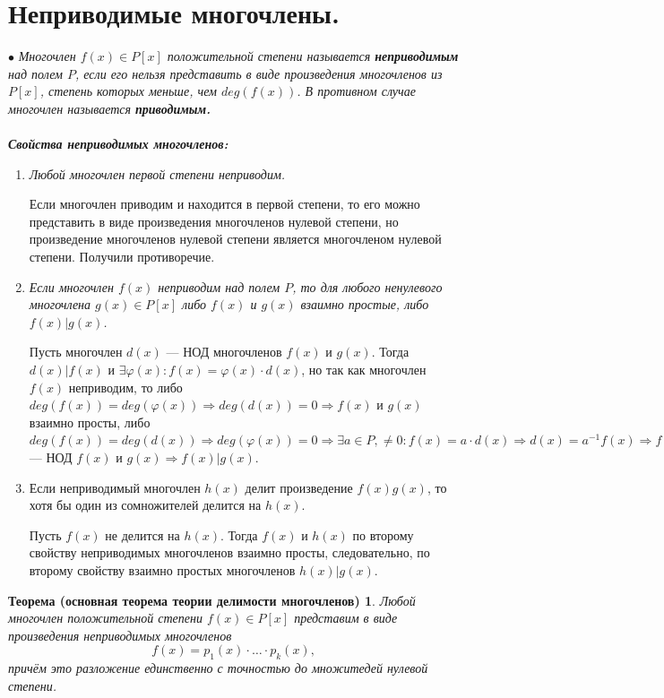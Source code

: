 \section{Неприводимые многочлены.}
$\bullet$ \textit{Многочлен $f(x) \in P[x]$ положительной степени называется \textbf{неприводимым} над полем $P$, если его нельзя представить в виде произведения многочленов из $P[x]$, степень которых меньше, чем $deg(f(x))$. В противном случае многочлен называется \textbf{приводимым.}}\\\\
\textbf{\textit{Свойства неприводимых многочленов:}}
\begin{enumerate}
	\item \textit{Любой многочлен первой степени неприводим.}
	\begin{Proof}
		Если многочлен приводим и находится в первой степени, то его можно представить в виде произведения многочленов нулевой степени, 
		но произведение многочленов нулевой степени является многочленом нулевой степени. Получили противоречие.
	\end{Proof}
	\item \textit{Если многочлен $f(x)$ неприводим над полем $P$, то для любого ненулевого многочлена $g(x)\in P[x]$ либо $f(x)$ и $g(x)$ взаимно простые, либо $f(x)|g(x)$.}
	\begin{Proof}
		Пусть многочлен $d(x)$ --- НОД многочленов $f(x)$ и $g(x)$. Тогда $d(x)|f(x)$ и $\exists \varphi(x): f(x) = \varphi(x)\cdot d(x)$, но так как многочлен $f(x)$ неприводим, то 
		либо $deg(f(x)) = deg(\varphi(x)) \Rightarrow deg(d(x)) = 0 \Rightarrow  f(x)$ и $g(x)$ взаимно просты, либо $deg(f(x)) =  deg(d(x)) \Rightarrow deg(\varphi(x)) = 0\Rightarrow \exists a \in P, \ne 0: f(x) = a\cdot d(x)\Rightarrow d(x) = a^{-1}f(x)\Rightarrow f(x)|d(x) \Rightarrow f(x)$ --- НОД $f(x)$ и $g(x) \Rightarrow f(x)|g(x)$.
	\end{Proof}
	\item Если неприводимый многочлен $h(x)$ делит произведение $f(x)g(x)$, то хотя бы один из сомножителей делится на $h(x)$.
	\begin{Proof}
		Пусть $f(x)$ не делится на $h(x)$. Тогда $f(x)$ и $h(x)$ по второму свойству неприводимых многочленов 
		взаимно просты, следовательно, по второму свойству взаимно простых многочленов $h(x)|g(x)$. 
	\end{Proof}
\end{enumerate}	
\newtheorem*{851}{Теорема (основная теорема теории делимости многочленов)}\begin{851}
	Любой многочлен положительной степени $f(x) \in P[x]$
	представим в виде произведения неприводимых многочленов $$f(x) = p_1(x)\cdot \ldots \cdot p_k(x),$$ причём это разложение единственно с точностью до множитедей нулевой степени.
\end{851}
